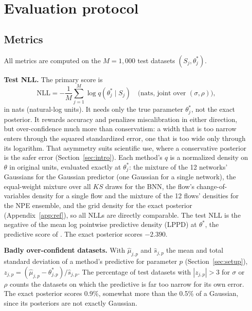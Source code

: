 \documentclass[11pt]{article}
\begin{document}
\section{Evaluation protocol}
\label{sec:eval}

\subsection{Metrics}
\label{sec:metrics}
All metrics are computed on the $M=1{,}000$ test datasets $(S_j,\theta^\ast_j)$.

\textbf{Test NLL.} The primary score is
\begin{equation}
\label{eq:nll}
\mathrm{NLL}=-\frac1M\sum_{j=1}^{M}\log q(\theta^\ast_j\mid S_j)\quad\text{(nats, joint over }(\sigma,\rho)\text{)},
\end{equation}
in nats (natural-log units). It needs only the true parameter $\theta^\ast_j$, not the exact posterior. It rewards
accuracy and penalizes miscalibration in either direction, but over-confidence much more than conservatism: a width
that is too narrow enters through the squared standardized error, one that is too wide only through its logarithm.
That asymmetry suits scientific use, where a conservative posterior is the safer error (Section~\ref{sec:intro}). Each method's $q$ is a normalized
density on $\theta$ in original units, evaluated exactly at $\theta^\ast_j$: the mixture of the 12 networks' Gaussians
for the Gaussian predictor (one Gaussian for a single network), the equal-weight mixture over all $KS$ draws for the
BNN, the flow's change-of-variables density for a single flow and the mixture of the 12 flows' densities for the NPE
ensemble, and the grid density for the exact posterior (Appendix~\ref{app:ref}), so all NLLs are directly comparable.
The test NLL is the negative of the mean log pointwise predictive density (LPPD) at $\theta^\ast$, the predictive score
of \citet{sommer2024connecting}. The exact posterior scores $-2.390$.

\textbf{Badly over-confident datasets.} With $\hat\mu_{j,p}$ and $\hat s_{j,p}$ the mean and total standard deviation of a
method's predictive for parameter $p$ (Section~\ref{sec:setup}), $z_{j,p}=(\hat\mu_{j,p}-\theta^\ast_{j,p})/\hat s_{j,p}$. The
percentage of test datasets with $|z_{j,p}|>3$ for $\sigma$ or $\rho$ counts the datasets on which the predictive is far
too narrow for its own error. The exact posterior scores 0.9\%, somewhat more than the 0.5\% of a Gaussian, since its
posteriors are not exactly Gaussian.
\end{document}
